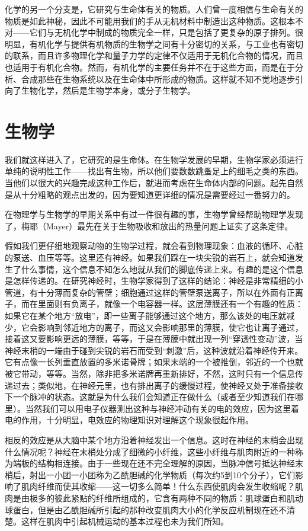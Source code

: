 化学的另一个分支是，它研究与生命体有关的物质。人们曾一度相信与生命有关的物质是如此神秘，因此不可能用我们的手从无机材料中制造出这种物质。这根本不对——它们与无机化学中制成的物质完全一样，只是包括了更复杂的原子排列。很明显，有机化学与提供有机物质的生物学之间有十分密切的关系，与工业也有密切的联系，而且许多物理化学和量子力学的定律不仅适用于无机化合物的情况，而且也适用于有机化合物。然而，有机化学的主要任务并不在于这些方面，而是在于分析、合成那些在生物系统以及在生命体中所形成的物质。这样就不知不觉地逐步引向了生物化学，然后是生物学本身，或分子生物学。


\section{生物学}

我们就这样进入了，它研究的是生命体。在生物学发展的早期，生物学家必须进行单纯的说明性工作——找出有生物，所以他们要数数跳蚤足上的细毛之类的东西。当他们以很大的兴趣完成这种工作后，就进而考虑在生命体内部的问题。起先自然是从十分粗略的观点出发的，因为要知道更详细的情况是需要经过一番努力的。

在物理学与生物学的早期关系中有过一件很有趣的事，生物学曾经帮助物理学发现了，梅耶（Mayer）最先在关于生物吸收和放出的热量问题上证实了这条定律。

假如我们更仔细地观察动物的生物学过程，就会看到物理现象：血液的循环、心脏的泵送、血压等等。这里还有神经。如果我们踩在一块尖锐的岩石上，就会知道发生了什么事情，这个信息不知怎么地就从我们的脚底传递上来。有趣的是这个信息是怎样传递的。在研究神经时，生物学家得到了这样的结论：神经是非常精细的小管道，有十分薄而复杂的管壁；细胞通过这样的管壁泵送离子，所以在外面有正离子，而在里面则有负离子，就像一个电容器一样。这层薄膜还有一个有趣的性质：如果它在某个地方“放电”，即一些离子能够通过这个地方，那么该处的电压就减少，它会影响到邻近地方的离子，而这又会影响那里的薄膜，使它也让离子通过，接着这又要影响更远的薄膜，等等，于是在薄膜中就出现一列“穿透性变动”波，当神经末梢的一端由于碰到尖锐的岩石而受到“刺激”后，这种波就沿着神经传开来。它有点像一长列垂直放置的多米诺骨牌；如果末端的一个被推倒，邻近的一个也就被它带动，等等。当然，除非把多米诺牌再重新排好，不然，这时只有一个信息传递过去；类似地，在神经元里，也有排出离子的缓慢过程，使神经又处于准备接收下一个脉冲的状态。这就是为什么我们会知道正在做什么（或者至少知道我们在哪里）。当然我们可以用电子仪器测出这种与神经冲动有关的电的效应，因为这里着电的作用，十分明显，电效应的物理知识对理解这个现象很起作用。

相反的效应是从大脑中某个地方沿着神经发出一个信息。这时在神经的末梢会出现什么情况呢？神经在末梢处分成了细微的小纤维，这些小纤维与肌肉附近的一种称为端板的结构相连接。由于一些现在还不完全理解的原因，当脉冲信号抵达神经末梢后，射出一小团一小团称为乙酰胆碱的化学物质（每次约5到10个分子），它们影响了肌肉纤维而使其收缩——这一切多么简单！什么东西使肌肉会发生收缩呢？肌肉是由极多的彼此紧贴的纤维所组成的，它含有两种不同的物质：肌球蛋白和肌动球蛋白，但是由乙酰胆碱所引起的那种改变肌肉大小的化学反应机制现在还不清楚。这样在肌肉中引起机械运动的基本过程也未为我们所知。

